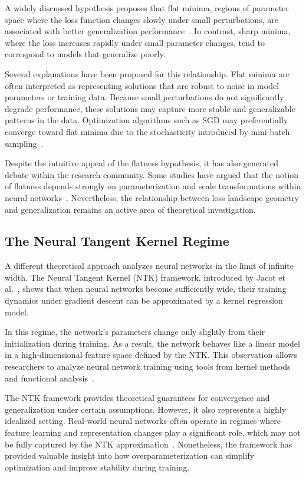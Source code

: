 \documentclass[conference]{IEEEtran}
\begin{document}
A widely discussed hypothesis proposes that flat minima, regions of parameter space where the loss function changes slowly under small perturbations, are associated with better generalization performance~\cite{hochreiter1997flat}. In contrast, sharp minima, where the loss increases rapidly under small parameter changes, tend to correspond to models that generalize poorly.

Several explanations have been proposed for this relationship. Flat minima are often interpreted as representing solutions that are robust to noise in model parameters or training data. Because small perturbations do not significantly degrade performance, these solutions may capture more stable and generalizable patterns in the data. Optimization algorithms such as SGD may preferentially converge toward flat minima due to the stochasticity introduced by mini-batch sampling~\cite{chaudhari2017entropy}.

Despite the intuitive appeal of the flatness hypothesis, it has also generated debate within the research community. Some studies have argued that the notion of flatness depends strongly on parameterization and scale transformations within neural networks~\cite{dinh2017sharp}. Nevertheless, the relationship between loss landscape geometry and generalization remains an active area of theoretical investigation.

\subsection{The Neural Tangent Kernel Regime}

A different theoretical approach analyzes neural networks in the limit of infinite width. The Neural Tangent Kernel (NTK) framework, introduced by Jacot et al.~\cite{jacot2018neural}, shows that when neural networks become sufficiently wide, their training dynamics under gradient descent can be approximated by a kernel regression model.

In this regime, the network's parameters change only slightly from their initialization during training. As a result, the network behaves like a linear model in a high-dimensional feature space defined by the NTK. This observation allows researchers to analyze neural network training using tools from kernel methods and functional analysis~\cite{belkin2018understand}.

The NTK framework provides theoretical guarantees for convergence and generalization under certain assumptions. However, it also represents a highly idealized setting. Real-world neural networks often operate in regimes where feature learning and representation changes play a significant role, which may not be fully captured by the NTK approximation~\cite{allenzhu2019convergence}. Nonetheless, the framework has provided valuable insight into how overparameterization can simplify optimization and improve stability during training.
\end{document}
